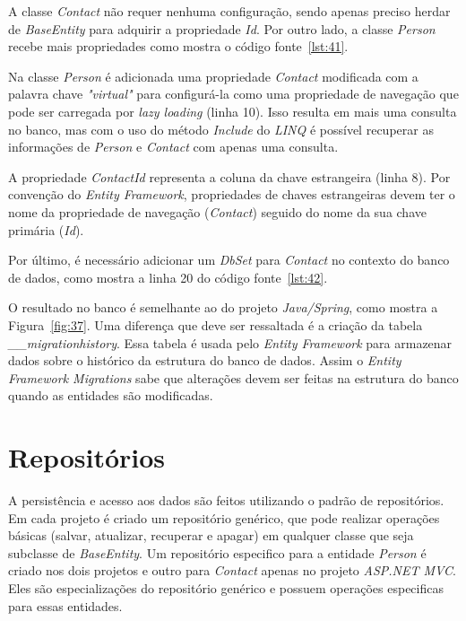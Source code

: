 
A classe \textit{Contact} não requer nenhuma configuração, sendo apenas preciso herdar de \textit{BaseEntity} para adquirir a propriedade \textit{Id}. Por outro lado, a classe \textit{Person} recebe mais propriedades como mostra o código fonte~\ref{lst:41}.


Na classe \textit{Person} é adicionada uma propriedade \textit{Contact} modificada com a palavra chave \textit{"virtual"} para configurá-la como uma propriedade de navegação que pode ser carregada por \textit{lazy loading} (linha 10). Isso resulta em mais uma consulta no banco, mas com o uso do método \textit{Include} do \textit{LINQ} é possível recuperar as informações de \textit{Person} e \textit{Contact} com apenas uma consulta.

A propriedade \textit{ContactId} representa a coluna da chave estrangeira (linha 8). Por convenção do \textit{Entity Framework}, propriedades de chaves estrangeiras devem ter o nome da propriedade de navegação (\textit{Contact}) seguido do nome da sua chave primária (\textit{Id}).

Por último, é necessário adicionar um \textit{DbSet} para \textit{Contact} no contexto do banco de dados, como mostra a linha 20 do código fonte~\ref{lst:42}.


O resultado no banco é semelhante ao do projeto \textit{Java/Spring}, como mostra a Figura~\ref{fig:37}. Uma diferença que deve ser ressaltada é a criação da tabela \textit{\_\_migrationhistory}. Essa tabela é usada pelo \textit{Entity Framework} para armazenar dados sobre o histórico da estrutura do banco de dados. Assim o \textit{Entity Framework Migrations} sabe que alterações devem ser feitas na estrutura do banco quando as entidades são modificadas.


\section{Repositórios}

A persistência e acesso aos dados são feitos utilizando o padrão de repositórios. Em cada projeto é criado um repositório genérico, que pode realizar operações básicas (salvar, atualizar, recuperar e apagar) em qualquer classe que seja subclasse de \textit{BaseEntity}. Um repositório especifico para a entidade \textit{Person} é criado nos dois projetos e outro para \textit{Contact} apenas no projeto \textit{ASP.NET MVC}. Eles são especializações do repositório genérico e possuem operações especificas para essas entidades.

